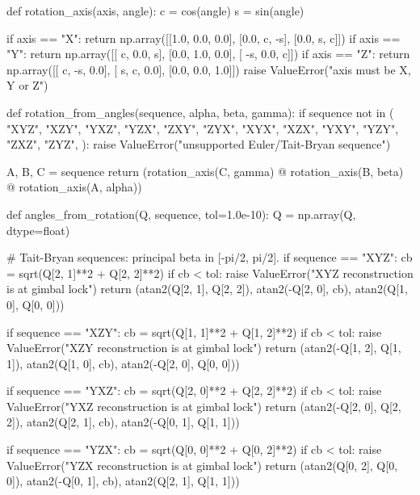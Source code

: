 \begin{python}
def rotation_axis(axis, angle):
    c = cos(angle)
    s = sin(angle)

    if axis == "X":
        return np.array([[1.0, 0.0, 0.0],
                         [0.0,   c,  -s],
                         [0.0,   s,   c]])
    if axis == "Y":
        return np.array([[  c, 0.0,   s],
                         [0.0, 1.0, 0.0],
                         [ -s, 0.0,   c]])
    if axis == "Z":
        return np.array([[  c,  -s, 0.0],
                         [  s,   c, 0.0],
                         [0.0, 0.0, 1.0]])
    raise ValueError("axis must be X, Y or Z")


def rotation_from_angles(sequence, alpha, beta, gamma):
    if sequence not in (
        "XYZ", "XZY", "YXZ", "YZX", "ZXY", "ZYX",
        "XYX", "XZX", "YXY", "YZY", "ZXZ", "ZYZ",
    ):
        raise ValueError("unsupported Euler/Tait-Bryan sequence")

    A, B, C = sequence
    return (rotation_axis(C, gamma)
            @ rotation_axis(B, beta)
            @ rotation_axis(A, alpha))


def angles_from_rotation(Q, sequence, tol=1.0e-10):
    Q = np.array(Q, dtype=float)

    # Tait-Bryan sequences: principal beta in [-pi/2, pi/2].
    if sequence == "XYZ":
        cb = sqrt(Q[2, 1]**2 + Q[2, 2]**2)
        if cb < tol:
            raise ValueError("XYZ reconstruction is at gimbal lock")
        return (atan2(Q[2, 1], Q[2, 2]),
                atan2(-Q[2, 0], cb),
                atan2(Q[1, 0], Q[0, 0]))

    if sequence == "XZY":
        cb = sqrt(Q[1, 1]**2 + Q[1, 2]**2)
        if cb < tol:
            raise ValueError("XZY reconstruction is at gimbal lock")
        return (atan2(-Q[1, 2], Q[1, 1]),
                atan2(Q[1, 0], cb),
                atan2(-Q[2, 0], Q[0, 0]))

    if sequence == "YXZ":
        cb = sqrt(Q[2, 0]**2 + Q[2, 2]**2)
        if cb < tol:
            raise ValueError("YXZ reconstruction is at gimbal lock")
        return (atan2(-Q[2, 0], Q[2, 2]),
                atan2(Q[2, 1], cb),
                atan2(-Q[0, 1], Q[1, 1]))

    if sequence == "YZX":
        cb = sqrt(Q[0, 0]**2 + Q[0, 2]**2)
        if cb < tol:
            raise ValueError("YZX reconstruction is at gimbal lock")
        return (atan2(Q[0, 2], Q[0, 0]),
                atan2(-Q[0, 1], cb),
                atan2(Q[2, 1], Q[1, 1]))


\end{python}
